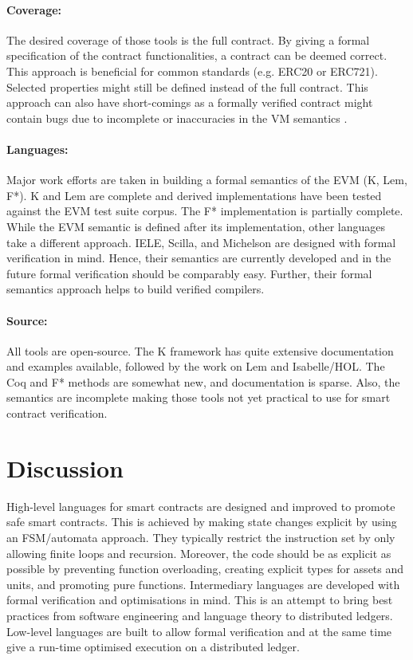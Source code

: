 \documentclass{llncs}
\begin{document}
\paragraph{Coverage:} The desired coverage of those tools is the full contract. By giving a formal specification of the contract functionalities, a contract can be deemed correct. This approach is beneficial for common standards (e.g. ERC20 or ERC721). Selected properties might still be defined instead of the full contract. This approach can also have short-comings as a formally verified contract might contain bugs due to incomplete or inaccuracies in the VM semantics \cite{Hirai2016}.

\paragraph{Languages:} Major work efforts are taken in building a formal semantics of the EVM (K, Lem, F*). K and Lem are complete and derived implementations have been tested against the EVM test suite corpus. The F* implementation is partially complete. While the EVM semantic is defined after its implementation, other languages take a different approach. IELE, Scilla, and Michelson are designed with formal verification in mind. Hence, their semantics are currently developed and in the future formal verification should be comparably easy. Further, their formal semantics approach helps to build verified compilers.

\paragraph{Source:} All tools are open-source. The K framework has quite extensive documentation and examples available, followed by the work on Lem and Isabelle/HOL. The Coq and F* methods are somewhat new, and documentation is sparse. Also, the semantics are incomplete making those tools not yet practical to use for smart contract verification.


\section{Discussion}
\label{discuss}

High-level languages for smart contracts are designed and improved to promote safe smart contracts.
This is achieved by making state changes explicit by using an FSM/automata approach. 
They typically restrict the instruction set by only allowing finite loops and recursion.
Moreover, the code should be as explicit as possible by preventing function overloading, creating explicit types for assets and units, and promoting pure functions.
Intermediary languages are developed with formal verification and optimisations in mind.
This is an attempt to bring best practices from software engineering and language theory to distributed ledgers.
Low-level languages are built to allow formal verification and at the same time give a run-time optimised execution on a distributed ledger.
\end{document}
